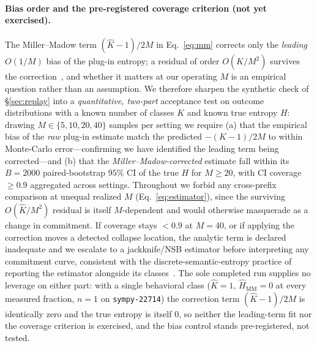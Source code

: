 \documentclass[11pt]{article}
\begin{document}
\paragraph{Bias order and the pre-registered coverage criterion (not yet exercised).}
The Miller--Madow term $(\hat K-1)/2M$ in Eq.~\eqref{eq:mm} corrects only the
\emph{leading} $O(1/M)$ bias of the plug-in entropy; a residual of order
$O(\hat K/M^2)$ survives the correction~\citep{cover2006elements}, and whether it
matters at our operating $M$ is an empirical question rather than an assumption. We
therefore sharpen the synthetic check of \S\ref{sec:replay} into a \emph{quantitative,
two-part} acceptance test on outcome distributions with a known number of classes
$K$ and known true entropy $H$: drawing $M\in\{5,10,20,40\}$ samples per setting we
require (a) that the empirical bias of the \emph{raw} plug-in estimate match the
predicted $-(K-1)/2M$ to within Monte-Carlo error---confirming we have identified the
leading term being corrected---and (b) that the \emph{Miller--Madow-corrected}
estimate fall within its $B=2000$ paired-bootstrap $95\%$ CI of the true $H$ for
$M\ge20$, with CI coverage $\ge0.9$ aggregated across settings. Throughout we forbid
any cross-prefix comparison at unequal realized $M$ (Eq.~\eqref{eq:estimator}), since
the surviving $O(\hat K/M^2)$ residual is itself $M$-dependent and would otherwise
masquerade as a change in commitment. If coverage stays $<0.9$ at $M=40$, or if
applying the correction moves a detected collapse location, the analytic term is
declared inadequate and we escalate to a jackknife/NSB estimator before interpreting
any commitment curve, consistent with the discrete-semantic-entropy practice of
reporting the estimator alongside its classes~\citep{farquhar2024semantic,kuhn2023semantic}.
The sole completed run supplies no leverage on either part: with a single behavioral
class ($\hat K=1$, $\widehat{H}_{\mathrm{MM}}=0$ at every measured fraction,
$n\!=\!1$ on \texttt{sympy-22714}) the correction term $(\hat K-1)/2M$ is identically
zero and the true entropy is itself $0$, so neither the leading-term fit nor the
coverage criterion is exercised, and the bias control stands pre-registered, not
tested.
\end{document}
